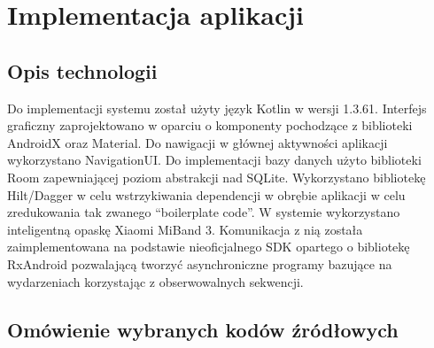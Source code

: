 \chapter{Implementacja aplikacji}
\thispagestyle{chapterBeginStyle}

\section{Opis technologii}

Do implementacji systemu został użyty język Kotlin w wersji 1.3.61. Interfejs graficzny zaprojektowano w oparciu o komponenty pochodzące z
biblioteki AndroidX oraz Material. Do nawigacji w głównej aktywności aplikacji wykorzystano NavigationUI. Do implementacji bazy danych użyto biblioteki
Room zapewniającej poziom abstrakcji nad SQLite. Wykorzystano bibliotekę Hilt/Dagger w celu wstrzykiwania dependencji w obrębie aplikacji w celu zredukowania
tak zwanego ``boilerplate code''.
\newline\newline
W systemie wykorzystano inteligentną opaskę Xiaomi MiBand 3. Komunikacja z nią została zaimplementowana na podstawie nieoficjalnego SDK opartego o bibliotekę
RxAndroid pozwalającą tworzyć asynchroniczne programy bazujące na wydarzeniach korzystając z obserwowalnych sekwencji.


\section{Omówienie wybranych kodów źródłowych}

